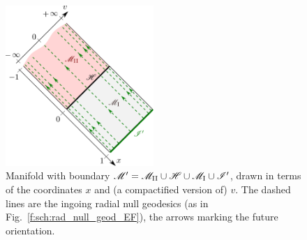 \begin{figure}
\centerline{\includegraphics[width=0.5\textwidth]{sch_conf_compl1.pdf}}
\caption[]{\label{f:sch:conf_compl1} \footnotesize
Manifold with boundary
$\mathscr{M}' = \mathscr{M}_{\rm II}\cup\mathscr{H}\cup\mathscr{M}_{\rm I}\cup\mathscr{I}'$, drawn in terms of
the coordinates $x$ and (a compactified version of) $v$.
The dashed lines are the ingoing radial null geodesics (as in Fig.~\ref{f:sch:rad_null_geod_EF}), the arrows marking the future orientation.}
\end{figure}


